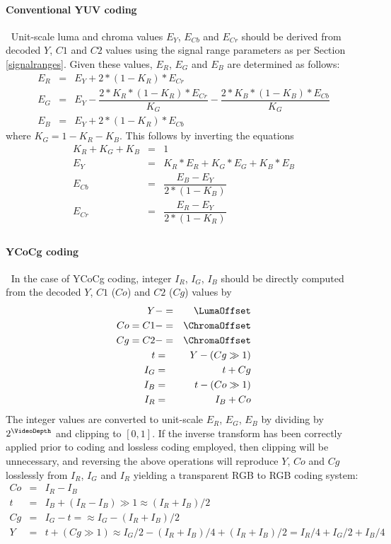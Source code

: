 \begin{informative*}
\paragraph{Conventional YUV coding}
$\ $\newline
Unit-scale luma and chroma values $E_Y$, $E_{Cb}$ and $E_{Cr}$ should be
derived from decoded $Y$, $C1$ and $C2$ values using the signal range parameters
as per Section \ref{signalranges}. Given these values, $E_R$, $E_G$ and $E_B$ are
determined as follows:
\begin{eqnarray*}
E_R & = & E_Y + 2*(1-K_R)*E_{Cr} \\
E_G & = & E_Y - \dfrac{2*K_R*(1-K_R)*E_{Cr}}{K_G}-\dfrac{2*K_B*(1-K_B)*E_{Cb}}{K_G} \\
E_B & = & E_Y + 2*(1-K_R)*E_{Cb} 
\end{eqnarray*}
where $K_G=1-K_R-K_B$.
This follows by inverting the equations 
\begin{eqnarray*}
K_R+K_G+K_B & = & 1 \\
E_Y & = & K_R*E_R+K_G*E_G+K_B*E_B \\
E_{Cb} & = & \dfrac{E_B - E_Y}{2*(1-K_B)} \\
E_{Cr} & = & \dfrac{E_R - E_Y}{2*(1-K_R)} \\
\end{eqnarray*}

\paragraph{YCoCg coding}
$\ $\newline
In the case of YCoCg coding, integer $I_R$, $I_G$, $I_B$ should be directly computed from
the decoded $Y$, $C1$ ($Co$) and $C2$ ($Cg$) values by
\begin{eqnarray*}
Y & -= & \LumaOffset \\
Co=C1 & -= & \ChromaOffset \\
Cg=C2 & -= & \ChromaOffset \\
t & = & Y-(Cg\gg1) \\
I_G & = & t+Cg \\
I_B & = & t-(Co\gg1) \\
I_R & = & I_B+Co
\end{eqnarray*}
The integer values are converted to unit-scale $E_R$, $E_G$, $E_B$ by dividing by 
$2^\VideoDepth$ and clipping to $[0,1]$.
If the inverse transform has been correctly
applied prior to coding and lossless coding employed, then clipping will
be unnecessary, and reversing the above operations will reproduce $Y$, $Co$ and $Cg$
losslessly from $I_R$, $I_G$ and $I_R$ yielding a transparent RGB to RGB coding system:
\begin{eqnarray*}
Co & = & I_R-I_B \\
t & = & I_B+(I_R-I_B)\gg1 \approx (I_R+I_B)/2\\
Cg & = & I_G-t = \approx I_G-(I_R+I_B)/2\\
Y & = & t+(Cg\gg1) \approx I_G/2-(I_R+I_B)/4+(I_R+I_B)/2=I_R/4+I_G/2+I_B/4
\end{eqnarray*}


\end{informative*}
